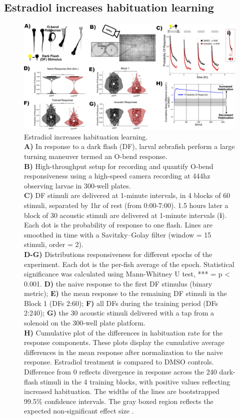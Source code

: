 \documentclass[9pt,lineno]{RandlettLab_elife}
\begin{document}
\subsection{Estradiol increases habituation learning}


\begin{figure}
\begin{fullwidth}
\begin{center}
\includegraphics[width=0.95\linewidth]{figures/EstradiolEffect.png}
\caption{Estradiol increases habituation learning.
\\ \textbf{A)} In response to a dark flash (DF), larval zebrafish perform a large turning maneuver termed an O-bend response.
\\ \textbf{B)} High-throughput setup for recording and quantify O-bend responsiveness using a high-speed camera recording at 444hz observing larvae in 300-well plates.
\\ \textbf{C)} DF stimuli are delivered at 1-minute intervals, in 4 blocks of 60 stimuli, separated by 1hr of rest (from 0:00-7:00). 1.5 hours later a block of 30 acoustic stimuli are delivered at 1-minute intervals (\textbf{i}). Each dot is the probability of response to one flash. Lines are smoothed in time with a Savitzky–Golay filter (window = 15 stimuli, order = 2). 
\\ \textbf{D-G)} Distributions responsiveness for different epochs of the experiment. Each dot is the per-fish average of the epoch. Statistical significance was calculated using Mann-Whitney U test, *** = p < 0.001.  \textbf{D)} the naive response to the first DF stimulus (binary metric); \textbf{E)} the mean response to the remaining DF stimuli in the Block 1 (DFs 2:60); \textbf{F)} all DFs during the training period (DFs 2:240); \textbf{G)} the 30 acoustic stimuli delivered with a tap from a solenoid on the 300-well plate platform. 
\\ \textbf{H)} Cumulative plot of the differences in habituation rate for the response components. These plots display the cumulative average differences in the mean response after normalization to the naive response. Estradiol treatment is compared to DMSO controls. Difference from 0 reflects divergence in response across the 240 dark-flash stimuli in the 4 training blocks, with positive values reflecting increased habituation. The widths of the lines are bootstrapped 99.5\% confidence intervals. The gray boxed region reflects the expected non-significant effect size \citep{Randlett2019-fj}.
}
\end{center}
\end{fullwidth}
\end{figure}
\end{document}
